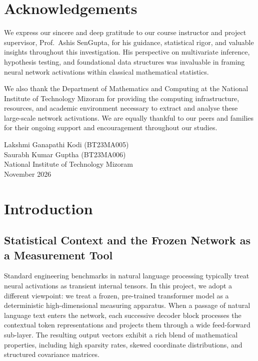 \documentclass[12pt, a4paper, oneside]{report}
\theoremstyle{definition}
\begin{document}
\chapter*{Acknowledgements}

We express our sincere and deep gratitude to our course instructor and project supervisor, Prof.\ Ashis SenGupta, for his guidance, statistical rigor, and valuable insights throughout this investigation. His perspective on multivariate inference, hypothesis testing, and foundational data structures was invaluable in framing neural network activations within classical mathematical statistics.

We also thank the Department of Mathematics and Computing at the National Institute of Technology Mizoram for providing the computing infrastructure, resources, and academic environment necessary to extract and analyse these large-scale network activations. We are equally thankful to our peers and families for their ongoing support and encouragement throughout our studies.

\vspace{1.2cm}
\noindent Lakshmi Ganapathi Kodi (BT23MA005)\\
Saurabh Kumar Guptha (BT23MA006)\\
National Institute of Technology Mizoram\\
November 2026

\tableofcontents
\listoffigures
\listoftables

\clearpage
{}
\setcounter{page}{1}

\chapter{Introduction}

\section{Statistical Context and the Frozen Network as a Measurement Tool}

Standard engineering benchmarks in natural language processing typically treat neural activations as transient internal tensors. In this project, we adopt a different viewpoint: we treat a frozen, pre-trained transformer model as a deterministic high-dimensional measuring apparatus. When a passage of natural language text enters the network, each successive decoder block processes the contextual token representations and projects them through a wide feed-forward sub-layer. The resulting output vectors exhibit a rich blend of mathematical properties, including high sparsity rates, skewed coordinate distributions, and structured covariance matrices.
\end{document}
